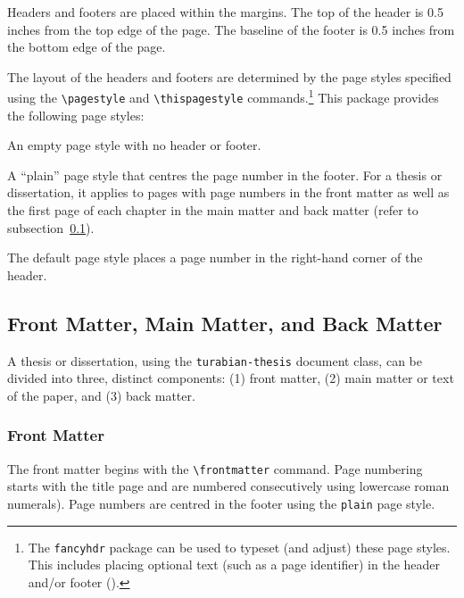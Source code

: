 \documentclass{article}
\newcommand{\textcmd}[1]{\texttt{\textbackslash #1}}
\newenvironment{pagestyleoptions}
	{\list{}{%
		\setlength\topsep{0in}
		\setlength\itemsep{1\baselineskip}
		\setlength\parsep{0pt}
		\setlength\labelwidth{0.75in}
		\setlength\leftmargin{1in}
		\setlength\listparindent{0in}
		\setlength\itemindent{0in}
		\setlength\labelsep{0pt}
		\let\makelabel\pagestylelabel}
		\singlespacing}
	{\endlist}
\newcommand*{\pagestylelabel}[1]{\parbox[t]{\labelwidth}{\normalfont \texttt{#1}}}
\begin{document}
Headers and footers are placed within the margins. The top of the header is 0.5 inches from the top edge of the page. The baseline of the footer is 0.5 inches from the bottom edge of the page.\autocite[384, 386]{turabian_manual_2018}

The layout of the headers and footers are determined by the page styles specified using the \textcmd{pagestyle} and \textcmd{thispagestyle} commands.\footnote{%
	The \texttt{fancyhdr} package can be used to typeset (and adjust) these page styles. This includes placing optional text (such as a page identifier) in the header and/or footer (\autocite[386]{turabian_manual_2018}).}
This package provides the following page styles:

\begin{pagestyleoptions}
	\item[empty] An empty page style with no header or footer.

	\item[plain] A ``plain'' page style that centres the page number in the footer. For a thesis or dissertation, it applies to pages with page numbers in the front matter as well as the first page of each chapter in the main matter and back matter (refer to subsection~\ref{subsec:td_structure}).

	\item[headings] The default page style places a page number in the right-hand corner of the header.
\end{pagestyleoptions}


\subsection{Front Matter, Main Matter, and Back Matter}
\label{subsec:td_structure}

A thesis or dissertation, using the \texttt{turabian-thesis} document class, can be divided into three, distinct components: (1) front matter, (2) main matter or text of the paper, and (3) back matter.\autocite[387--388]{turabian_manual_2018}

\subsubsection*{Front Matter}

The front matter begins with the \textcmd{frontmatter} command. Page numbering starts with the title page and are numbered consecutively using lowercase roman numerals). Page numbers are centred in the footer using the \texttt{plain} page style.\autocite[386]{turabian_manual_2018}
\end{document}
